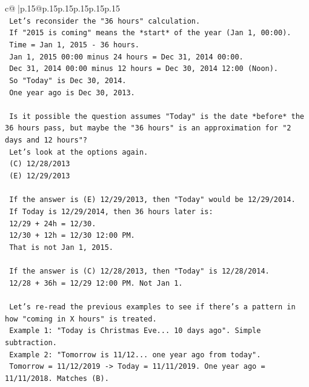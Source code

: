 \documentclass{article}
\begin{document}
{\begin{supertabular}{c@{$\;$}|p{.15\linewidth}@{}p{.15\linewidth}p{.15\linewidth}p{.15\linewidth}p{.15\linewidth}p{.15\linewidth}}
{{{\\ 
\texttt{    Let's reconsider the "36 hours" calculation.} \\
\texttt{    If "2015 is coming" means the *start* of the year (Jan 1, 00:00).} \\
\texttt{    Time = Jan 1, 2015 {-} 36 hours.} \\
\texttt{    Jan 1, 2015 00:00 minus 24 hours = Dec 31, 2014 00:00.} \\
\texttt{    Dec 31, 2014 00:00 minus 12 hours = Dec 30, 2014 12:00 (Noon).} \\
\texttt{    So "Today" is Dec 30, 2014.} \\
\texttt{    One year ago is Dec 30, 2013.} \\
\\ 
\texttt{    Is it possible the question assumes "Today" is the date *before* the 36 hours pass, but maybe the "36 hours" is an approximation for "2 days and 12 hours"?} \\
\texttt{    Let's look at the options again.} \\
\texttt{    (C) 12/28/2013} \\
\texttt{    (E) 12/29/2013} \\
\\ 
\texttt{    If the answer is (E) 12/29/2013, then "Today" would be 12/29/2014.} \\
\texttt{    If Today is 12/29/2014, then 36 hours later is:} \\
\texttt{    12/29 + 24h = 12/30.} \\
\texttt{    12/30 + 12h = 12/30 12:00 PM.} \\
\texttt{    That is not Jan 1, 2015.} \\
\\ 
\texttt{    If the answer is (C) 12/28/2013, then "Today" is 12/28/2014.} \\
\texttt{    12/28 + 36h = 12/29 12:00 PM. Not Jan 1.} \\
\\ 
\texttt{    Let's re{-}read the previous examples to see if there's a pattern in how "coming in X hours" is treated.} \\
\texttt{    Example 1: "Today is Christmas Eve... 10 days ago". Simple subtraction.} \\
\texttt{    Example 2: "Tomorrow is 11/12... one year ago from today".} \\
\texttt{    Tomorrow = 11/12/2019 {-}> Today = 11/11/2019. One year ago = 11/11/2018. Matches (B).} \\
}}}
\end{supertabular}}
\end{document}
